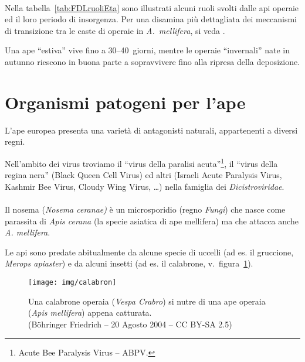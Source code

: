 \paragraph{}
Nella tabella~\ref{tab:FDLruoliEta} sono illustrati alcuni ruoli svolti dalle api operaie ed il loro periodo di insorgenza.
Per una disamina più dettagliata dei meccanismi di transizione tra le caste di operaie in \emph{A.~mellifera},
si veda \cite{meccanica}.

Una ape ``estiva'' vive fino a 30--40~giorni, mentre le operaie ``invernali'' nate in autunno
riescono in buona parte a sopravvivere fino alla ripresa della deposizione.




\section{Organismi patogeni per l'ape}
L'ape europea presenta una varietà di antagonisti naturali, appartenenti a diversi regni.

Nell'ambito dei virus troviamo il ``virus della paralisi acuta''\footnote{Acute Bee Paralysis Virus -- ABPV.}, il ``virus della regina nera'' (Black Queen Cell Virus) ed altri (Israeli Acute Paralysis Virus, Kashmir Bee Virus, Cloudy Wing Virus, \dots) nella famiglia dei \emph{Dicistroviridae}. %

\paragraph{}
Il nosema (\emph{Nosema ceranae)} è un microsporidio (regno \emph{Fungi}) che nasce come parassita di \emph{Apis cerana} (la specie asiatica di ape mellifera) ma che attacca anche \emph{A. mellifera}.

Le api sono predate abitualmente da alcune specie di uccelli (ad es. il gruccione, \emph{Merops apiaster}) e da alcuni insetti (ad es. il calabrone, v.~figura~\ref{img:calabron}).

\begin{figure}[hbt]
    \centering
    \texttt{[image: img/calabron]}

    \caption[Ape predata da un calabrone.]{Una calabrone operaia (\emph{Vespa Crabro}) si
        nutre di una ape operaia (\emph{Apis mellifera}) appena catturata.
        \\ (Böhringer Friedrich -- 20 Agosto 2004 -- CC BY-SA 2.5)
    }
    \label{img:calabron}
\end{figure}

